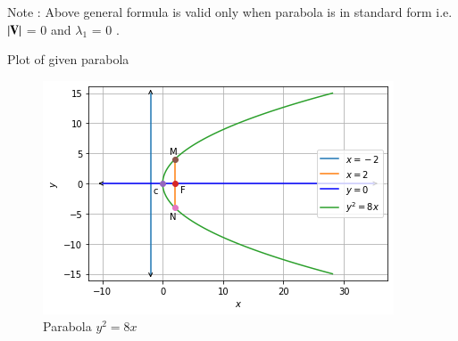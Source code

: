 \documentclass[journal,12pt,twocolumn]{IEEEtran}
\begin{document}
Note : Above general formula is valid only when parabola is in standard form i.e. $\left\vert\mathbf{V}\right\vert$ = 0 and $\lambda_1$ = 0 .

\newpage 
Plot of given parabola

\begin{figure}[!ht]
\centering
\includegraphics[width=\columnwidth]{Figure6}
\caption{Parabola $y^2=8x$ }
\label{fig:parabola}	
\end{figure}
\end{document}

